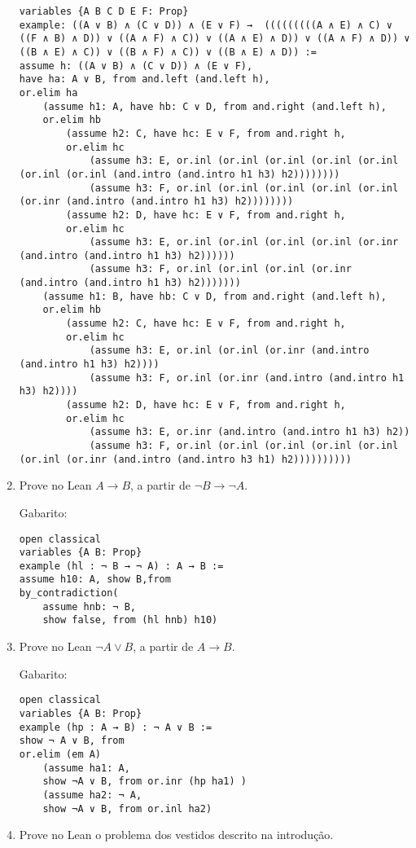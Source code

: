 \begin{enumerate}
\begin{lstlisting}
variables {A B C D E F: Prop}
example: ((A ∨ B) ∧ (C ∨ D)) ∧ (E ∨ F) →  (((((((((A ∧ E) ∧ C) ∨ ((F ∧ B) ∧ D)) ∨ ((A ∧ F) ∧ C)) ∨ ((A ∧ E) ∧ D)) ∨ ((A ∧ F) ∧ D)) ∨ ((B ∧ E) ∧ C)) ∨ ((B ∧ F) ∧ C)) ∨ ((B ∧ E) ∧ D)) :=
assume h: ((A ∨ B) ∧ (C ∨ D)) ∧ (E ∨ F),
have ha: A ∨ B, from and.left (and.left h),
or.elim ha
    (assume h1: A, have hb: C ∨ D, from and.right (and.left h),
    or.elim hb
        (assume h2: C, have hc: E ∨ F, from and.right h,
        or.elim hc
            (assume h3: E, or.inl (or.inl (or.inl (or.inl (or.inl (or.inl (or.inl (and.intro (and.intro h1 h3) h2))))))))
            (assume h3: F, or.inl (or.inl (or.inl (or.inl (or.inl (or.inr (and.intro (and.intro h1 h3) h2))))))))
        (assume h2: D, have hc: E ∨ F, from and.right h,
        or.elim hc
            (assume h3: E, or.inl (or.inl (or.inl (or.inl (or.inr (and.intro (and.intro h1 h3) h2))))))
            (assume h3: F, or.inl (or.inl (or.inl (or.inr (and.intro (and.intro h1 h3) h2)))))))
    (assume h1: B, have hb: C ∨ D, from and.right (and.left h),
    or.elim hb
        (assume h2: C, have hc: E ∨ F, from and.right h,
        or.elim hc
            (assume h3: E, or.inl (or.inl (or.inr (and.intro (and.intro h1 h3) h2))))
            (assume h3: F, or.inl (or.inr (and.intro (and.intro h1 h3) h2))))
        (assume h2: D, have hc: E ∨ F, from and.right h,
        or.elim hc
            (assume h3: E, or.inr (and.intro (and.intro h1 h3) h2))
            (assume h3: F, or.inl (or.inl (or.inl (or.inl (or.inl (or.inl (or.inr (and.intro (and.intro h3 h1) h2))))))))))
\end{lstlisting}
\bigbreak
\item Prove no Lean $A \rightarrow B$, a partir de $\neg B \rightarrow \neg A$.

Gabarito:
\begin{lstlisting}
open classical
variables {A B: Prop}
example (hl : ¬ B → ¬ A) : A → B :=
assume h10: A, show B,from
by_contradiction(
    assume hnb: ¬ B,
    show false, from (hl hnb) h10)
\end{lstlisting}
\bigbreak
\item Prove no Lean $\neg A \lor B$, a partir de $A \rightarrow B$.

Gabarito:
\begin{lstlisting}
open classical
variables {A B: Prop}
example (hp : A → B) : ¬ A ∨ B :=
show ¬ A ∨ B, from
or.elim (em A)
    (assume ha1: A,
    show ¬A ∨ B, from or.inr (hp ha1) )
    (assume ha2: ¬ A,
    show ¬A ∨ B, from or.inl ha2)
\end{lstlisting}
\bigbreak
\item Prove no Lean o problema dos vestidos descrito na introdução.


\end{enumerate}
